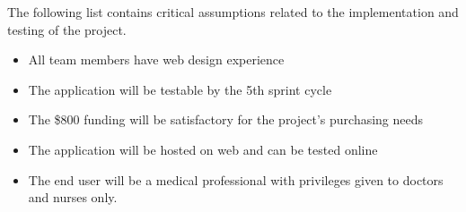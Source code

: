 The following list contains critical assumptions related to the implementation and testing of the project.

\begin{itemize}
\item All team members have web design experience
  \item The application will be testable by the 5th sprint cycle
  \item The \$800 funding will be satisfactory for the project's purchasing needs
  \item The application will be hosted on web and can be tested online
  \item The end user will be a medical professional with privileges given to doctors and nurses only. 
 
  
\end{itemize}